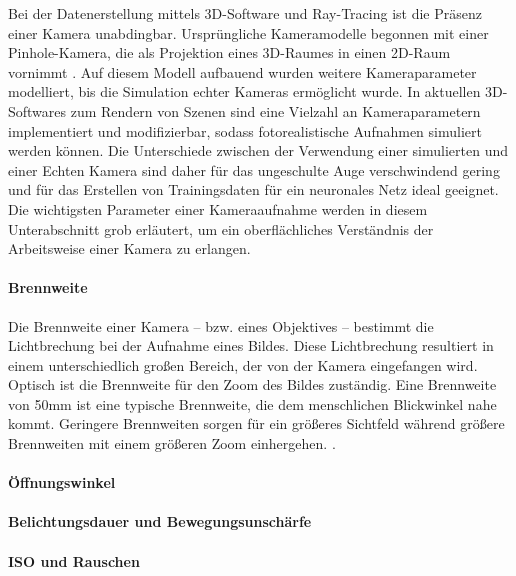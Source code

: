 Bei der Datenerstellung mittels 3D-Software und Ray-Tracing ist die Präsenz einer Kamera unabdingbar. Ursprüngliche Kameramodelle begonnen mit einer Pinhole-Kamera, die als Projektion eines 3D-Raumes in einen 2D-Raum vornimmt \cite{pinhole_camera}. Auf diesem Modell aufbauend wurden weitere Kameraparameter modelliert, bis die Simulation echter Kameras ermöglicht wurde. In aktuellen 3D-Softwares zum Rendern von Szenen sind eine Vielzahl an Kameraparametern implementiert und modifizierbar, sodass fotorealistische Aufnahmen simuliert werden können. Die Unterschiede zwischen der Verwendung einer simulierten und einer Echten Kamera sind daher für das ungeschulte Auge verschwindend gering und für das Erstellen von Trainingsdaten für ein neuronales Netz ideal geeignet. Die wichtigsten Parameter einer Kameraaufnahme werden in diesem Unterabschnitt grob erläutert, um ein oberflächliches Verständnis der Arbeitsweise einer Kamera zu erlangen.

\paragraph{Brennweite}

Die Brennweite einer Kamera -- bzw. eines Objektives -- bestimmt die Lichtbrechung bei der Aufnahme eines Bildes. Diese Lichtbrechung resultiert in einem unterschiedlich großen Bereich, der von der Kamera eingefangen wird. Optisch ist die Brennweite für den Zoom des Bildes zuständig. Eine Brennweite von 50mm ist eine typische Brennweite, die dem menschlichen Blickwinkel nahe kommt. Geringere Brennweiten sorgen für ein größeres Sichtfeld während größere Brennweiten mit einem größeren Zoom einhergehen. \cite{focal_lentgh}.

\paragraph{Öffnungswinkel}


\paragraph{Belichtungsdauer und Bewegungsunschärfe}


\paragraph{ISO und Rauschen}

